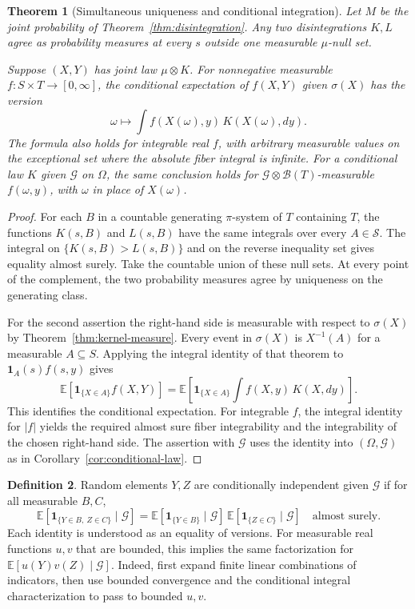 \documentclass[11pt,oneside,openany]{book}
\newcommand{\E}{\mathbb{E}}
\newcommand{\ind}{\mathbf{1}}
\theoremstyle{plain}
\newtheorem{theorem}{Theorem}[chapter]
\theoremstyle{definition}
\newtheorem{definition}[theorem]{Definition}
\theoremstyle{remark}
\begin{document}
\begin{theorem}[Simultaneous uniqueness and conditional integration]\label{thm:kernel-conditional-integration}
Let \(M\) be the joint probability of Theorem~\ref{thm:disintegration}. Any two disintegrations \(K,L\) agree as probability measures at every \(s\) outside one measurable \(\mu\)-null set.

Suppose \((X,Y)\) has joint law \(\mu\otimes K\). For nonnegative measurable \(f:S\times T\to[0,\infty]\), the conditional expectation of \(f(X,Y)\) given \(\sigma(X)\) has the version
\[
  \omega\longmapsto \int f(X(\omega),y)\,K(X(\omega),dy).
\]
The formula also holds for integrable real \(f\), with arbitrary measurable values on the exceptional set where the absolute fiber integral is infinite. For a conditional law \(K\) given \(\mathcal G\) on \(\Omega\), the same conclusion holds for \(\mathcal G\otimes\mathcal B(T)\)-measurable \(f(\omega,y)\), with \(\omega\) in place of \(X(\omega)\).
\end{theorem}
\begin{proof}
For each \(B\) in a countable generating \(\pi\)-system of \(T\) containing \(T\), the functions \(K(s,B)\) and \(L(s,B)\) have the same integrals over every \(A\in\mathcal S\). The integral on \(\{K(s,B)>L(s,B)\}\) and on the reverse inequality set gives equality almost surely. Take the countable union of these null sets. At every point of the complement, the two probability measures agree by uniqueness on the generating class.

For the second assertion the right-hand side is measurable with respect to \(\sigma(X)\) by Theorem~\ref{thm:kernel-measure}. Every event in \(\sigma(X)\) is \(X^{-1}(A)\) for a measurable \(A\subseteq S\). Applying the integral identity of that theorem to \(\ind_A(s)f(s,y)\) gives
\[
 \E\!\left[\ind_{\{X\in A\}}f(X,Y)\right]
 =\E\!\left[\ind_{\{X\in A\}}\int f(X,y)\,K(X,dy)\right].
\]
This identifies the conditional expectation. For integrable \(f\), the integral identity for \(\lvert f\rvert\) yields the required almost sure fiber integrability and the integrability of the chosen right-hand side. The assertion with \(\mathcal G\) uses the identity into \((\Omega,\mathcal G)\) as in Corollary~\ref{cor:conditional-law}.
\end{proof}

\begin{definition}
Random elements \(Y,Z\) are conditionally independent given \(\mathcal G\) if for all measurable \(B,C\),
\[
 \E[\ind_{\{Y\in B,\ Z\in C\}}\mid\mathcal G]
  =\E[\ind_{\{Y\in B\}}\mid\mathcal G]\,
   \E[\ind_{\{Z\in C\}}\mid\mathcal G]
 \quad\text{almost surely}.
\]
Each identity is understood as an equality of versions. For measurable real functions \(u,v\) that are bounded, this implies the same factorization for \(\E[u(Y)v(Z)\mid\mathcal G]\). Indeed, first expand finite linear combinations of indicators, then use bounded convergence and the conditional integral characterization to pass to bounded \(u,v\).
\end{definition}
\end{document}
